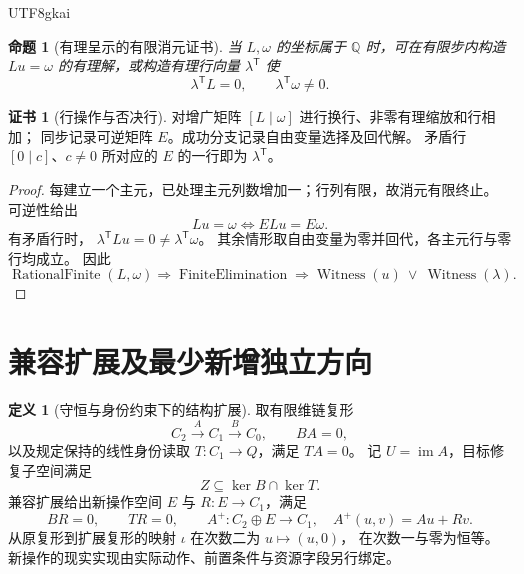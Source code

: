 \documentclass[12pt,a4paper,openany,notitlepage]{report}
\theoremstyle{plain}
\newtheorem{proposition}[theorem]{命题}
\theoremstyle{definition}
\newtheorem{definition}[theorem]{定义}
\newtheorem*{certificate}{证书}
\theoremstyle{remark}
\begin{document}
\begin{CJK*}{UTF8}{gkai}
\begin{proposition}[有理呈示的有限消元证书]
\label{hgov:prop-elimination}
当 $L,\omega$ 的坐标属于 $\mathbb Q$ 时，可在有限步内构造
$Lu=\omega$ 的有理解，或构造有理行向量 $\lambda^{\mathsf T}$ 使
\[
 \lambda^{\mathsf T}L=0,\qquad
 \lambda^{\mathsf T}\omega\ne0.
\]
\end{proposition}
\begin{certificate}[行操作与否决行]
对增广矩阵 $[L\mid\omega]$ 进行换行、非零有理缩放和行相加；
同步记录可逆矩阵 $E$。成功分支记录自由变量选择及回代解。
矛盾行 $[0\mid c]$、$c\ne0$ 所对应的 $E$ 的一行即为 $\lambda^{\mathsf T}$。
\end{certificate}
\begin{proof}
每建立一个主元，已处理主元列数增加一；行列有限，故消元有限终止。
可逆性给出
\[
 Lu=\omega\Longleftrightarrow ELu=E\omega.
\]
有矛盾行时，
$\lambda^{\mathsf T}Lu=0\ne\lambda^{\mathsf T}\omega$。
其余情形取自由变量为零并回代，各主元行与零行均成立。
因此
\[
 \operatorname{RationalFinite}(L,\omega)
 \Longrightarrow
 \operatorname{FiniteElimination}
 \Longrightarrow
 \operatorname{Witness}(u)\ \vee\ \operatorname{Witness}(\lambda).
\]
\end{proof}

\section{兼容扩展及最少新增独立方向}
\label{hgov:compatible-extension}

\begin{definition}[守恒与身份约束下的结构扩展]
\label{hgov:def-extension}
取有限维链复形
\[
 C_2\xrightarrow{A}C_1\xrightarrow{B}C_0,\qquad BA=0,
\]
以及规定保持的线性身份读取 $T:C_1\to Q$，满足 $TA=0$。
记 $U=\operatorname{im}A$，目标修复子空间满足
\[
 Z\subseteq\ker B\cap\ker T.
\]
兼容扩展给出新操作空间 $E$ 与 $R:E\to C_1$，满足
\[
 BR=0,\qquad TR=0,\qquad
 A^+:C_2\oplus E\longrightarrow C_1,\quad A^+(u,v)=Au+Rv.
\]
从原复形到扩展复形的映射 $\iota$ 在次数二为 $u\mapsto(u,0)$，
在次数一与零为恒等。新操作的现实实现由实际动作、前置条件与资源字段另行绑定。
\end{definition}


\end{CJK*}
\end{document}
